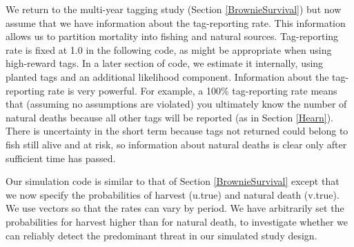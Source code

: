 \documentclass[
]{krantz}
\begin{document}
We return to the multi-year tagging study (Section \ref{BrownieSurvival}) but now assume that we have information about the tag-reporting rate. This information allows us to partition mortality into fishing and natural sources. Tag-reporting rate is fixed at 1.0 in the following code, as might be appropriate when using high-reward tags. In a later section of code, we estimate it internally, using planted tags \citep{hearn.etal_2003} and an additional likelihood component. Information about the tag-reporting rate is very powerful. For example, a 100\% tag-reporting rate means that (assuming no assumptions are violated) you ultimately know the number of natural deaths because all other tags will be reported (as in Section \ref{Hearn}). There is uncertainty in the short term because tags not returned could belong to fish still alive and at risk, so information about natural deaths is clear only after sufficient time has passed.

Our simulation code is similar to that of Section \ref{BrownieSurvival} except that we now specify the probabilities of harvest (u.true) and natural death (v.true). We use vectors so that the rates can vary by period. We have arbitrarily set the probabilities for harvest higher than for natural death, to investigate whether we can reliably detect the predominant threat in our simulated study design.
\end{document}
